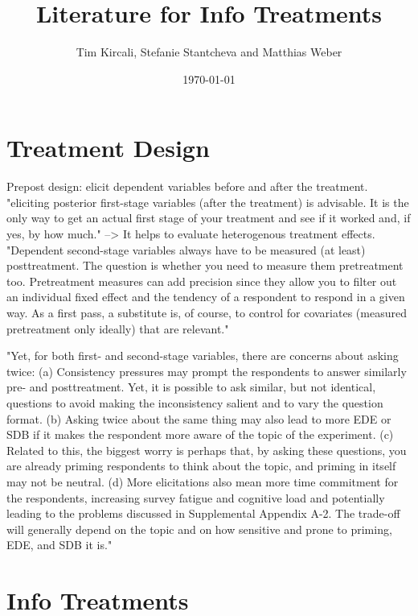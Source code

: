 \documentclass[12pt]{article}
\title{Literature for Info Treatments}
\author{Tim Kircali, Stefanie Stantcheva and Matthias Weber}
\date{\today} %
\begin{document}
\maketitle

\tableofcontents
\section{Treatment Design}
Prepost design: elicit dependent variables before and after the treatment.
"eliciting posterior first-stage variables (after the treatment) is advisable. It is the only way to get an actual first stage of your treatment and see if it worked and, if yes, by how much." --> It helps to evaluate heterogenous treatment effects. \\
"Dependent second-stage variables always have to be measured (at least) posttreatment. The question is whether you need to measure them pretreatment too. Pretreatment measures can add precision since they allow you to filter out an individual fixed effect and the tendency of a respondent to respond in a given way. As a first pass, a substitute is, of course, to control for covariates (measured pretreatment only ideally) that are relevant."

"Yet, for both first- and second-stage variables, there are concerns about asking twice: (a) Consistency pressures may prompt the respondents to answer similarly pre- and posttreatment. Yet, it is possible to ask similar, but not identical, questions to avoid making the inconsistency salient and to vary the question format. (b) Asking twice about the same thing may also lead to more EDE or SDB if it makes the respondent more aware of the topic of the experiment. (c) Related to this, the biggest worry is perhaps that, by asking these questions, you are already priming respondents to think about the topic, and priming in itself may not be neutral. (d) More elicitations also mean more time commitment for the respondents, increasing survey fatigue and cognitive load and potentially leading to the problems discussed in Supplemental Appendix A-2. The trade-off will generally depend on the topic and on how sensitive and prone to priming, EDE, and SDB it is."

\section{Info Treatments}
\end{document}
